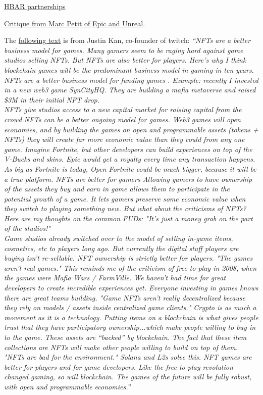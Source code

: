 \href{https://www.prnewswire.com/news-releases/hbar-foundation-and-ubisoft-partner-to-support-growth-of-gaming-on-hedera-network-301474971.html}{HBAR partnerships}\par
\href{https://finance.yahoo.com/news/epic-games-vp-people-have-lost-interest-in-the-metaverse-200725562.html}{Critique from Marc Petit of Epic and Unreal}.\par
The \href{https://twitter.com/justinkan/status/1491270239967154178}{following text} is from Justin Kan, co-founder of twitch: \textit{``NFTs are a better business model for games. Many gamers seem to be raging hard against game studios selling NFTs. But NFTs are also better for players. Here’s why I think blockchain games will be the predominant business model in gaming in ten years. NFTs are a better business model for funding games . Example: recently I invested in a new web3 game SynCityHQ. They are building a mafia metaverse and raised \$3M in their initial NFT drop.\\ NFTs give studios access to a new capital market for raising capital from the crowd.NFTs can be a better ongoing model for games. Web3 games will open economies, and by building the games on open and programmable assets (tokens + NFTs) they will create far more economic value than they could from any one game. Imagine Fortnite, but other developers can build experiences on top of the V-Bucks and skins. Epic would get a royalty every time any transaction happens. As big as Fortnite is today, Open Fortnite could be much bigger, because it will be a true platform. NFTs are better for gamers Allowing gamers to have ownership of the assets they buy and earn in game allows them to participate in the potential growth of a game. It lets gamers preserve some economic value when they switch to playing something new. But what about the criticisms of NFTs?\\
Here are my thoughts on the common FUDs: "It’s just a money grab on the part of the studios!"\\
Game studios already switched over to the model of selling in-game items, cosmetics, etc to players long ago. But currently the digital stuff players are buying isn’t re-sellable. NFT ownership is strictly better for players. "The games aren’t real games." This reminds me of the criticism of free-to-play in 2008, when the games were Mafia Wars / FarmVille. We haven’t had time for great developers to create incredible experiences yet. Everyone investing in games knows there are great teams building. "Game NFTs aren’t really decentralized because they rely on models / assets inside centralized game clients."
Crypto is as much a movement as it is a technology. Putting items on a blockchain is what gives people trust that they have participatory ownership...which make people willing to buy in to the game. These assets are “backed” by blockchain.
The fact that these item collections are NFTs will make other people willing to build on top of them. "NFTs are bad for the environment." Solana and L2s solve this. NFT games are better for players and for game developers. Like the free-to-play revolution changed gaming, so will blockchain. The games of the future will be fully robust, with open and programmable economies.}''


